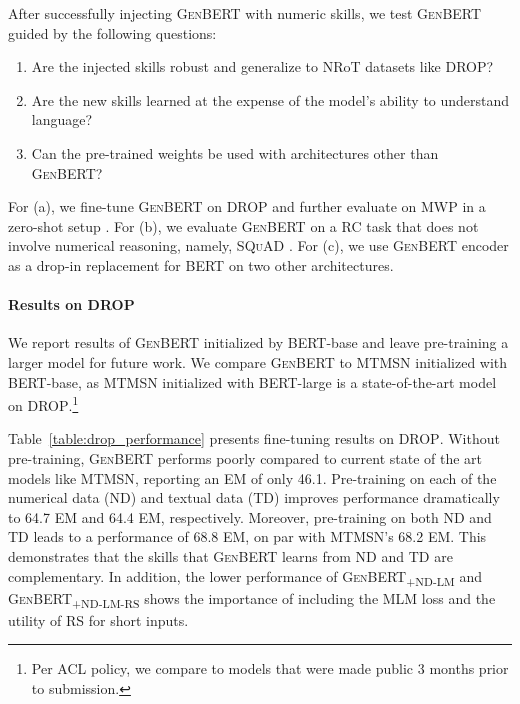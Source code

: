 \documentclass[11pt,a4paper]{article}
\newcommand\ssc[1]{\textsubscript{\textsc{#1}}}
\newcommand\bert{\textsc{BERT}}
\newcommand\genbert{\textsc{GenBERT}}
\newcommand\mtmsn{\textsc{MTMSN}}
\newcommand\drop{\textsc{DROP}}
\newcommand\squad{\textsc{SQuAD}}
\begin{document}
After successfully injecting \genbert{} with numeric skills, we test \genbert{} guided by the following questions:
\begin{enumerate}[label=(\alph*),leftmargin=*,topsep=0pt,itemsep=0pt,parsep=0pt]
    \item Are the injected skills robust and generalize to NRoT datasets like \drop?
    \item Are the new skills learned at the expense of the model's ability to understand language?
\item Can the pre-trained weights be used with architectures other than \genbert{}?
\end{enumerate}
For (a), we fine-tune \genbert{} on \drop{} and further evaluate on MWP in a zero-shot setup .
For (b), we evaluate \genbert{} on a RC task that does not involve numerical reasoning, namely, \squad{} \cite{rajpurkar2016squad}. For (c), we use \genbert{} encoder as a drop-in replacement for \bert{} on two other architectures.



\paragraph{Results on \drop{}}
We report results of \genbert{} initialized by \bert{}-base and leave pre-training a larger model 
for future work. We compare \genbert{} to 
\mtmsn{} \cite{hu2019multi} initialized with \bert{}-base, as \mtmsn{} initialized with \bert{}-large is a state-of-the-art model on \drop{}.\footnote{Per ACL policy, we compare to models that were made public 3 months prior to submission.}

Table~\ref{table:drop_performance} presents fine-tuning results on \drop{}. 
Without pre-training, \genbert{} performs poorly compared to current state of the art models like \mtmsn, reporting an EM of only 46.1. Pre-training on each of the numerical data (ND) and textual data (TD) improves performance dramatically to 64.7 EM and 64.4 EM, respectively. Moreover, pre-training on both ND and TD leads to a performance of 68.8 EM, on par with MTMSN's 68.2 EM. This demonstrates that the skills that \genbert{} learns from ND and TD are complementary.
In addition, the lower performance of \textsc{GenBERT\ssc{+ND-LM}} and \textsc{GenBERT\ssc{+ND-LM-RS}} shows the importance of including the MLM loss and the utility of RS for short inputs.
\end{document}

